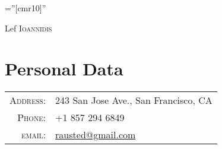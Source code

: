 \documentclass[lettersize,10pt]{article}
\begin{document}
\pagestyle{empty} %
\font\fb=''[cmr10]'' %

\par{\centering
		{\Huge Lef \textsc{Ioannidis}
	}\bigskip\par}

\section{Personal Data}

\begin{tabular}{rl}
    \textsc{Address:}   & 243 San Jose Ave., San Francisco, CA \\
    \textsc{Phone:}     & +1 857 294 6849\\
    \textsc{email:}     & \href{mailto:rausted@gmail.com}{rausted@gmail.com}
\end{tabular}

\end{document}
